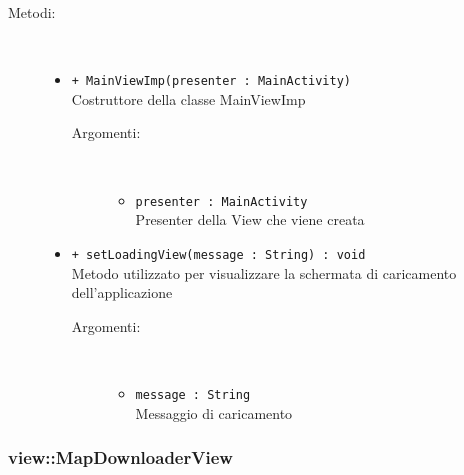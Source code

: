 \documentclass[../DefinizioneDiProdotto.tex]{subfiles}
\begin{document}
\begin{description}
\begin{itemize}
\end{itemize}
\item[Metodi:] \
\begin{itemize}
\item \texttt{+ MainViewImp(presenter : MainActivity)}\\
Costruttore della classe MainViewImp
 \begin{description}
\item[Argomenti:] \
\begin{itemize}
\item \texttt{presenter : MainActivity}\\
Presenter della View che viene creata\end{itemize}
\end{description}
\item \texttt{+ setLoadingView(message : String) : void}\\
Metodo utilizzato per visualizzare la schermata di caricamento dell'applicazione
 \begin{description}
\item[Argomenti:] \
\begin{itemize}
\item \texttt{message : String}\\
Messaggio di caricamento\end{itemize}
\end{description}
\end{itemize}
\end{description}

\subsubsection{view::MapDownloaderView}
\end{document}
